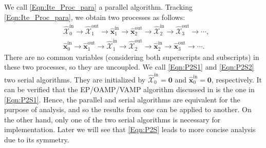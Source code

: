 \documentclass[journal]{IEEEtran}
\newcommand{\mr}{\mathrm}
\newcommand{\BS}{\begin{subequations}}
\newcommand{\ES}{\end{subequations}}
\renewcommand{\bf}{\bm}
\begin{document}
We call \eqref{Eqn:Ite_Proc_para} a parallel algorithm. Tracking \eqref{Eqn:Ite_Proc_para}, we obtain two processes as follows:\vspace{-2mm}
\BS\label{Eqn:P2S}\begin{align}
   & \bf{\mathcal{\hat{X}}}^{\mr{in}}_0 \to \bf{\mathcal{\hat{X}}}^{\mr{out}}_1 \to \bf{{\hat{x}}}^{\mr{in}}_1 \to \bf{{\hat{x}}}^{\mr{out}}_2 \to \bf{\mathcal{\hat{X}}}^{\mr{in}}_2 \to\bf{\mathcal{\hat{X}}}^{\mr{out}}_3 \to \cdots, \label{Eqn:P2S1}  \\
   & \bf{{\hat{x}}}^{\mr{in}}_0 \to \bf{{\hat{x}}}^{\mr{out}}_1 \to\bf{\mathcal{\hat{X}}}^{\mr{in}}_1 \to\bf{\mathcal{\hat{X}}}^{\mr{out}}_2 \to \bf{{\hat{x}}}^{\mr{in}}_2 \to\bf{{\hat{x}}}^{\mr{out}}_3\to \cdots.\label{Eqn:P2S2}
\end{align}\ES
There are no common variables (considering both superscripts and subscripts) in these two processes, so they are uncoupled. We call \eqref{Eqn:P2S1}  and \eqref{Eqn:P2S2} two serial algorithms. They are initialized by $\bf{\mathcal{\hat{X}}}^{\mr{in}}_0 \! =\! \bf{0}$ and  $\bf{{\hat{x}}}^{\mr{in}}_0\! =\! \bf{0}$, respectively. It can be verified that the EP/OAMP/VAMP algorithm discussed in \cite{Takeuchi2017} is the one in \eqref{Eqn:P2S1}. Hence, the parallel and serial algorithms are equivalent for the purpose of analysis, and so the results from one can be applied to another. On the other hand, only one of the two serial algorithms is necessary for implementation. Later we will see that \eqref{Eqn:P2S} leads to more concise analysis due to its symmetry.

\end{document}
